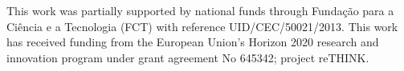 \documentclass[10pt,conference]{IEEEtran}
\begin{document}
This work was partially supported by national funds through Fundação para a Ciência e a Tecnologia (FCT) with reference UID/CEC/50021/2013.
This work has received funding from the European Union’s Horizon 2020 research and innovation program under grant agreement No 645342; project reTHINK.





\end{document}
